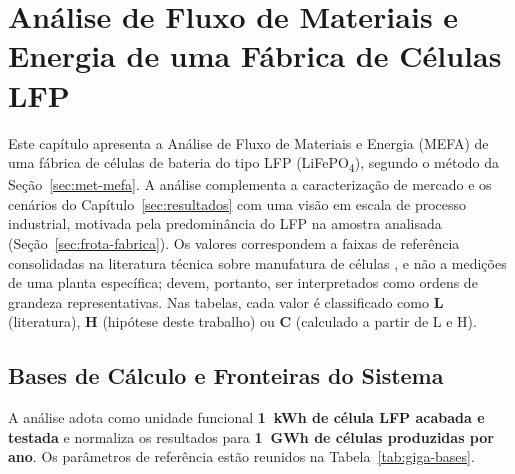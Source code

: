 \newpage
\section{Análise de Fluxo de Materiais e Energia de uma Fábrica de Células LFP}
\label{sec:gigafabrica}

Este capítulo apresenta a Análise de Fluxo de Materiais e Energia (MEFA) de uma
fábrica de células de bateria do tipo LFP (LiFePO\textsubscript{4}), segundo o
método da Seção~\ref{sec:met-mefa}. A análise complementa a caracterização de
mercado e os cenários do Capítulo~\ref{sec:resultados} com uma visão em escala de
processo industrial, motivada pela predominância do LFP na amostra analisada
(Seção~\ref{sec:frota-fabrica}). Os valores correspondem a faixas de referência
consolidadas na literatura técnica sobre manufatura de células
\cite{knehr2022batpac,degen2022,erakca2021,dai2019}, e não a medições de uma
planta específica; devem, portanto, ser interpretados como ordens de grandeza
representativas. Nas tabelas, cada valor é classificado como \textbf{L}
(literatura), \textbf{H} (hipótese deste trabalho) ou \textbf{C} (calculado a
partir de L e H).

\subsection{Bases de Cálculo e Fronteiras do Sistema}
\label{subsec:giga-bases}

A análise adota como unidade funcional \textbf{1~kWh de célula LFP acabada e
testada} e normaliza os resultados para \textbf{1~GWh de células produzidas por
ano}. Os parâmetros de referência estão reunidos na
Tabela~\ref{tab:giga-bases}.


